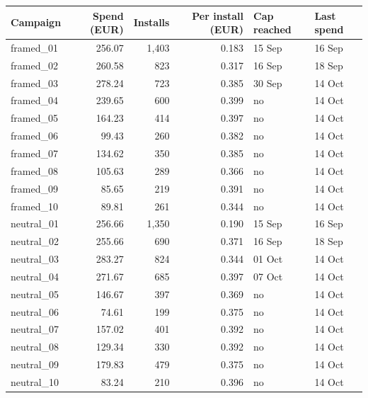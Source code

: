 \begin{tabular}{lrrrll}
\toprule
Campaign & Spend (EUR) & Installs & Per install (EUR) & Cap reached & Last spend \\
\midrule
framed\_01 & 256.07 & 1,403 & 0.183 & 15 Sep & 16 Sep \\
framed\_02 & 260.58 & 823 & 0.317 & 16 Sep & 18 Sep \\
framed\_03 & 278.24 & 723 & 0.385 & 30 Sep & 14 Oct \\
framed\_04 & 239.65 & 600 & 0.399 & no & 14 Oct \\
framed\_05 & 164.23 & 414 & 0.397 & no & 14 Oct \\
framed\_06 & 99.43 & 260 & 0.382 & no & 14 Oct \\
framed\_07 & 134.62 & 350 & 0.385 & no & 14 Oct \\
framed\_08 & 105.63 & 289 & 0.366 & no & 14 Oct \\
framed\_09 & 85.65 & 219 & 0.391 & no & 14 Oct \\
framed\_10 & 89.81 & 261 & 0.344 & no & 14 Oct \\
neutral\_01 & 256.66 & 1,350 & 0.190 & 15 Sep & 16 Sep \\
neutral\_02 & 255.66 & 690 & 0.371 & 16 Sep & 18 Sep \\
neutral\_03 & 283.27 & 824 & 0.344 & 01 Oct & 14 Oct \\
neutral\_04 & 271.67 & 685 & 0.397 & 07 Oct & 14 Oct \\
neutral\_05 & 146.67 & 397 & 0.369 & no & 14 Oct \\
neutral\_06 & 74.61 & 199 & 0.375 & no & 14 Oct \\
neutral\_07 & 157.02 & 401 & 0.392 & no & 14 Oct \\
neutral\_08 & 129.34 & 330 & 0.392 & no & 14 Oct \\
neutral\_09 & 179.83 & 479 & 0.375 & no & 14 Oct \\
neutral\_10 & 83.24 & 210 & 0.396 & no & 14 Oct \\
\bottomrule
\end{tabular}
